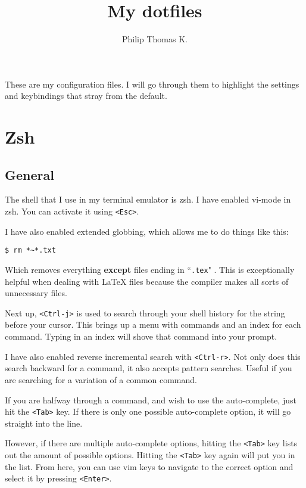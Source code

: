 \documentclass[12pt, a4paper]{article}
\title{My dotfiles}
\author{Philip Thomas K.}
\begin{document}
\maketitle

These are my configuration files.
I will go through them to highlight the settings and keybindings that stray from the default.

\section{Zsh}

\subsection{General}

The shell that I use in my terminal emulator is zsh.
I have enabled vi-mode in zsh.
You can activate it using \texttt{<Esc>}.

I have also enabled extended globbing, which allows me to do things like this:

\begin{center}
\verb|$ rm *~*.txt|
\end{center}

Which removes everything \textbf{except} files ending in ``\texttt{.tex}" .
This is exceptionally helpful when dealing with \LaTeX{} files because the compiler makes all sorts of unnecessary files.

Next up, \texttt{<Ctrl-j>} is used to search through your shell history for the string before your cursor.
This brings up a menu with commands and an index for each command.
Typing in an index will shove that command into your prompt.

I have also enabled reverse incremental search with \texttt{<Ctrl-r>}.
Not only does this search backward for a command, it also accepts pattern searches.
Useful if you are searching for a variation of a common command.

If you are halfway through a command, and wish to use the auto-complete, just hit the \texttt{<Tab>} key.
If there is only one possible auto-complete option, it will go straight into the line.

However, if there are multiple auto-complete options, hitting the \texttt{<Tab>} key lists out the amount of possible options.
Hitting the \texttt{<Tab>} key again will put you in the list.
From here, you can use vim keys to navigate to the correct option and select it by pressing \texttt{<Enter>}.
\end{document}
